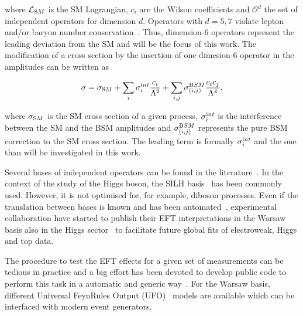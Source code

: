 where $\mathcal{L}_{\textrm SM}$ is the SM Lagrangian, $c_i$ are the Wilson coefficients and ${\mathcal{O}^{d}}$ the set of independent operators for dimension $d$. Operators with $d=5,7$  violate lepton and/or baryon number conservation~\cite{Degrande:2012wf,Kobach:2016ami}. Thus, dimension-6 operators represent the leading deviation from the SM and will be the focus of this work. The modification of a cross section by the insertion of one dimesion-6 operator in the amplitudes can be written as

\begin{equation}
\sigma = \sigma_{\textrm SM} + \sum_{i}\sigma_i^{\textrm int} \frac{c_i}{\Lambda^{2}} + \sum_{i,j}\sigma_{(i,j)}^{\textrm BSM} \frac{c_ic_j}{\Lambda^{4}} ,
\end{equation}  

where $\sigma_{\textrm SM}$ is the SM cross section of a given process, $\sigma_i^{\textrm int}$ is the interference between the SM and the BSM amplitudes and $\sigma_{(i,j)}^{\textrm BSM}$ represents the pure BSM correction to the SM cross section. The leading term is formally $\sigma_i^{\textrm int}$ and the one than will be investigated in this work. 

Several bases of independent operators can be found in the literature~\cite{Grzadkowski:2010es,Contino:2013kra,Gupta:2014rxa,Masso:2014xra}. In the context of the study of the Higgs boson, the SILH basis~\cite{Contino:2013kra} has been commonly used. However, it is not optimised for, for example, diboson processes. Even if the translation between bases is known and has been automated~\cite{Falkowski:2015wza,Aebischer:2017ugx}, experimental collaboration have started to publish their EFT interpretations in the Warsaw basis also in the Higgs sector~\cite{ATLAS:2019jst,ATL-PHYS-PUB-2019-042} to facilitate future global fits of electroweak, Higgs and top data.

The procedure to test the EFT effects for a given set of measurements can be tedious in practice and a big effort has been devoted to develop public code to perform this task in a automatic and generic way~\cite{Brivio:2019irc}. For the Warsaw basis, different Universal FeynRules Output (UFO)~\cite{Degrande:2011ua} models are available which can be interfaced with modern event generators.

